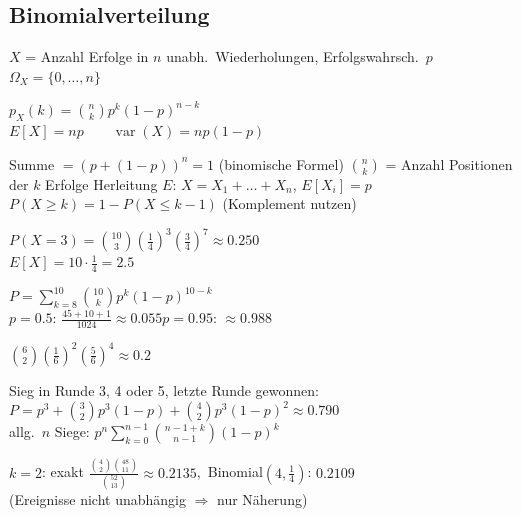 \subsection{Binomialverteilung}
\begin{merke}
\begin{itemize}
\pfeil $X$ = Anzahl Erfolge in $n$ unabh.\ Wiederholungen, Erfolgswahrsch.\ $p$
\pfeil $\Omega_X=\{0,\dots,n\}$
\end{itemize}
\end{merke}
\begin{formel}
$\displaystyle p_X(k)=\binom nk p^k(1-p)^{n-k}$\\[2pt]
$E[X]=np\qquad \operatorname{var}(X)=np(1-p)$
\end{formel}
\begin{itemize}
\pfeil Summe $=(p+(1-p))^n=1$ (binomische Formel)
\pfeil $\binom nk$ = Anzahl Positionen der $k$ Erfolge
\pfeil Herleitung $E$: $X=X_1+\dots+X_n$, $E[X_i]=p$
\pfeil $P(X\ge k)=1-P(X\le k-1)$ (Komplement nutzen)
\end{itemize}
\begin{bsp}[{{Aufg.\ 3.4.3: 10 Fragen, 4 Antworten, $p=\frac14$}}]
$P(X=3)=\binom{10}3(\frac14)^3(\frac34)^7\approx0.250$\\
$E[X]=10\cdot\frac14=2.5$
\end{bsp}
\begin{bsp}
$P=\sum_{k=8}^{10}\binom{10}k p^k(1-p)^{10-k}$\\
$p=0.5$: $\frac{45+10+1}{1024}\approx0.055$\quad $p=0.95$: $\approx0.988$
\end{bsp}
\begin{bsp}
$\binom62(\frac16)^2(\frac56)^4\approx0.2$
\end{bsp}
\begin{bsp}[{{Turnier: zuerst 3 Siege, Rundenwahrsch.\ $p=\frac23$}}]
Sieg in Runde 3, 4 oder 5, letzte Runde gewonnen:\\
$P=p^3+\binom32p^3(1-p)+\binom42p^3(1-p)^2\approx0.790$\\
allg.\ $n$ Siege: $p^n\sum_{k=0}^{n-1}\binom{n-1+k}{n-1}(1-p)^k$
\end{bsp}
\begin{bsp}
$k=2$: exakt $\frac{\binom42\binom{48}{11}}{\binom{52}{13}}\approx0.2135$,\ Binomial$(4,\frac14)$: $0.2109$\\
(Ereignisse nicht unabhängig $\Rightarrow$ nur Näherung)
\end{bsp}

